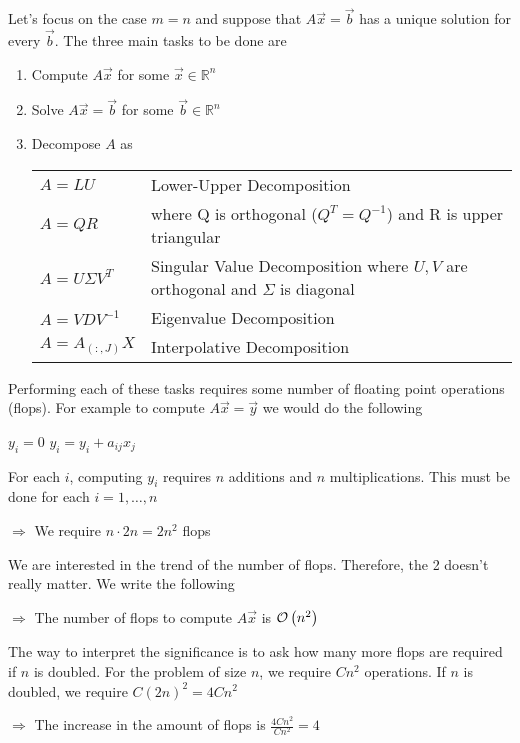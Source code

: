\begin{center}
	
\end{center}

Let's focus on the case $m=n$ and suppose that
$A\Vec{x} = \Vec{b}$ has a unique solution for every $\Vec{b}$. 
The three main tasks to be done are 
%
\begin{enumerate}[1)]
    \item Compute $A\Vec{x}$ for some $\Vec{x}\in\mathbb{R}^n$
    \item Solve $A\Vec{x}=\Vec{b}$ for some $\Vec{b}\in\mathbb{R}^n$
    \item Decompose $A$ as 
    
	    \begin{tabular}{lp{6cm}}
         $A=LU$ & Lower-Upper Decomposition  \\
         $A=QR$ & where Q is orthogonal ($Q^T=Q^{-1}$) and R is upper triangular\\
         $A=U\Sigma V^T$ & Singular Value Decomposition 
	 			where $U, V$ are orthogonal and $\Sigma$ is diagonal\\
         $A=VDV^{-1}$ & Eigenvalue Decomposition\\
         $A=A_{(:, J)}X$ & Interpolative Decomposition
    \end{tabular}
\end{enumerate}

Performing each of these tasks requires some number of floating point operations (flops). 
For example to compute $A\Vec{x} = \Vec{y}$ we would do the following
%
\begin{algorithm}
    \begin{algorithmic} 
            \STATE $y_i = 0$ 
                \STATE $y_i = y_i + a_{ij}x_j$ 
            \ENDFOR
        \ENDFOR
    \end{algorithmic}
\end{algorithm}
%
For each $i$, computing $y_i$ requires $n$ additions and $n$ multiplications. 
This must be done for each $i=1, \ldots, n$
%
\begin{displayquote}
$\Rightarrow$ We require $n \cdot 2n = 2n^2$ flops
\end{displayquote}
%
We are interested in the trend of the number of flops. 
Therefore, the 2 doesn't really matter. 
We write the following
%
\begin{displayquote}
    $\Rightarrow$ The number of flops to compute $A\Vec{x}$ is $\mathcal{O}\left(n^2\right)$
\end{displayquote}
%
The way to interpret the significance is to ask 
how many more flops are required if $n$ is doubled.
For the problem of size $n$, we require $Cn^2$ operations. 
If $n$ is doubled, we require $C(2n)^2=4Cn^2$
%
\begin{displayquote}
$\Rightarrow$ The increase in the amount of flops is $\frac{4Cn^2}{Cn^2} = 4$
\end{displayquote}

